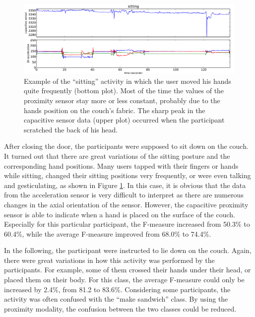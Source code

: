 \documentclass[runningheads,a4paper]{llncs}
\begin{document}
\begin{figure}
	\centering
		\includegraphics[width=1.00\textwidth]{../Auswertung/images/eugen_2.pdf}
	\caption{Example of the ``sitting'' activity in which the user moved his hands quite frequently (bottom plot). Most of the time the values of the proximity sensor stay more or less constant, probably due to the hands position on the couch's fabric. The sharp peak in the capacitive sensor data (upper plot) occurred when the participant scratched the back of his head. }
	\label{fig:sitting}
\end{figure}

After closing the door, the participants were supposed to sit down on the couch. It turned out that there are great variations of the sitting posture and the corresponding hand positions. Many users tapped with their fingers or hands while sitting, changed their sitting positions very frequently, or were even talking and gesticulating, as shown in Figure \ref{fig:sitting}. In this case, it is obvious that the data from the acceleration sensor is very difficult to interpret as there are numerous changes in the axial orientation of the sensor. However, the capacitive proximity sensor is able to indicate when a hand is placed on the surface of the couch. Especially for this particular participant, the F-measure increased from 50.3\% to 60.4\%, while the average F-measure improved from 68.0\% to 74.4\%. 

In the following, the participant were instructed to lie  down on the couch. Again, there were great variations in how this activity was performed by the participants. For example, some of them crossed their hands under their head, or placed them on their body. For this class, the average F-measure could only be increased by 2.4\%, from 81.2 to 83.6\%. Considering some participants, the activity was often confused with the ``make sandwich'' class. By using the proximity modality, the confusion between the two classes could be reduced.
\end{document}
